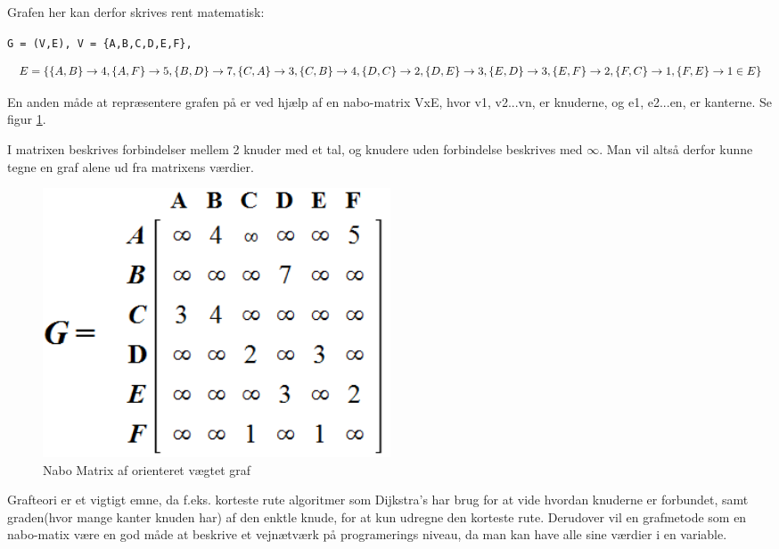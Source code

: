 \vspace{5mm}

Grafen her kan derfor skrives rent matematisk:

\vspace{5mm}

\verb!G = (V,E), V = {A,B,C,D,E,F},! 

\vspace{5mm}

\begin{equation}\label{grafteori}
E = \{ \{A,B\} \rightarrow 4, \{A,F\} \rightarrow 5, \{B,D\} \rightarrow 7, \{C,A\} \rightarrow 3, \{C,B\} \rightarrow 4, \{D,C\} \rightarrow 2, \{D,E\} \\ \rightarrow 3, \{E,D\} \rightarrow 3, \{E,F\} \rightarrow 2, \{F,C\} \rightarrow 1, \{F,E\} \rightarrow 1 \in  E\}
\end{equation}

\vspace{5mm}

En anden måde at repræsentere grafen på er ved hjælp af en nabo-matrix VxE, hvor v1, v2...vn, er knuderne, og e1, e2...en, er kanterne. Se figur \ref{fig:adjacency-matrix-weighted-directed-graph}. 

I matrixen beskrives forbindelser mellem 2 knuder med et tal, og knudere uden forbindelse beskrives med $\infty$. Man vil altså derfor kunne tegne en graf alene ud fra matrixens værdier.

\begin{figure}[H]
\begin{adjustbox}{width=0.5\textwidth,center=\textwidth}
\centering
\includegraphics[width=0.5\textwidth]{Pictures/Teoriafsnit/Figurfiler/adjacency_matrix_weighted_directed_graph.PNG}
\end{adjustbox}
\caption{Nabo Matrix af orienteret vægtet graf}
\label{fig:adjacency-matrix-weighted-directed-graph}
\end{figure}

Grafteori er et vigtigt emne, da f.eks. korteste rute algoritmer som Dijkstra's har brug for at vide hvordan knuderne er forbundet, samt graden(hvor mange kanter knuden har) af den enktle knude, for at kun udregne den korteste rute. Derudover vil en grafmetode som en nabo-matix være en god måde at beskrive et vejnætværk på programerings niveau, da man kan have alle sine værdier i en variable.


